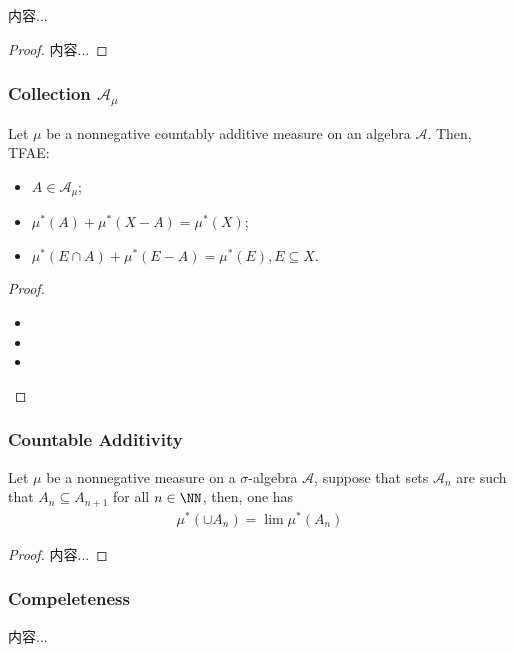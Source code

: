 \documentclass[Total.tex]{subfiles}
\begin{document}
				\begin{corollary}
					内容...
				\end{corollary}
				\begin{proof}
					内容...
				\end{proof}
				
				\subsubsection{Collection $\mathcal{A}_\mu$}
					\begin{proposition}
						Let $\mu$ be a nonnegative countably additive measure on an algebra $\mathcal{A}$. Then, TFAE:
						\begin{itemize}
							\item $A\in \mathcal{A}_\mu$;
							\item $\mu^*(A)+\mu^*(X-A)=\mu^*(X)$;
							\item $\mu^*(E\cap A)+\mu^*(E-A)=\mu^*(E),E\subseteq X$. 
						\end{itemize}
					\end{proposition}
					\begin{proof}
						\begin{itemize}
							\item 
							
							\item 
							
							\item 
						\end{itemize}
					\end{proof}
				\subsubsection{Countable Additivity}
					\begin{proposition}
						Let $\mu$ be a nonnegative measure on a $\sigma$-algebra $\mathcal{A}$, suppose that sets $\mathcal{A}_n$ are such that $A_n\subseteq A_{n+1}$ for all $n\in \NN$, then, one has
						\begin{gather*}
							\mu^*(\cup A_n)=\lim \mu^*(A_n)
						\end{gather*}
					\end{proposition}
					\begin{proof}
						内容...
					\end{proof}
				\subsubsection{Compeleteness}
					\begin{Def}
						内容...
					\end{Def}
					
\end{document}
